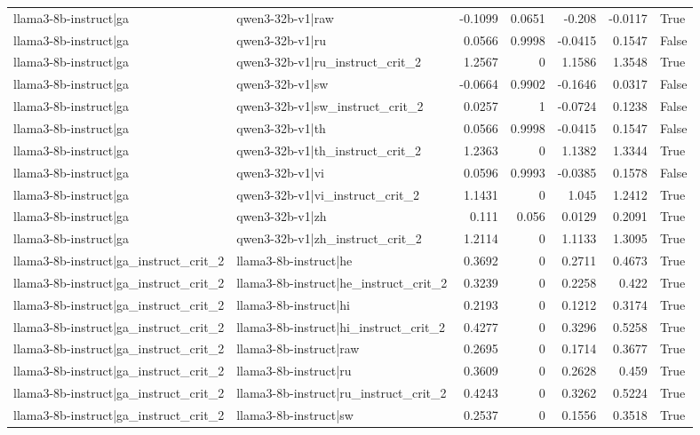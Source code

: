 \begin{table}
\begin{tabular}{l l r r r r l}
llama3-8b-instruct|ga & qwen3-32b-v1|raw & -0.1099 & 0.0651 & -0.208 & -0.0117 & True \\
llama3-8b-instruct|ga & qwen3-32b-v1|ru & 0.0566 & 0.9998 & -0.0415 & 0.1547 & False \\
llama3-8b-instruct|ga & qwen3-32b-v1|ru_instruct_crit_2 & 1.2567 & 0 & 1.1586 & 1.3548 & True \\
llama3-8b-instruct|ga & qwen3-32b-v1|sw & -0.0664 & 0.9902 & -0.1646 & 0.0317 & False \\
llama3-8b-instruct|ga & qwen3-32b-v1|sw_instruct_crit_2 & 0.0257 & 1 & -0.0724 & 0.1238 & False \\
llama3-8b-instruct|ga & qwen3-32b-v1|th & 0.0566 & 0.9998 & -0.0415 & 0.1547 & False \\
llama3-8b-instruct|ga & qwen3-32b-v1|th_instruct_crit_2 & 1.2363 & 0 & 1.1382 & 1.3344 & True \\
llama3-8b-instruct|ga & qwen3-32b-v1|vi & 0.0596 & 0.9993 & -0.0385 & 0.1578 & False \\
llama3-8b-instruct|ga & qwen3-32b-v1|vi_instruct_crit_2 & 1.1431 & 0 & 1.045 & 1.2412 & True \\
llama3-8b-instruct|ga & qwen3-32b-v1|zh & 0.111 & 0.056 & 0.0129 & 0.2091 & True \\
llama3-8b-instruct|ga & qwen3-32b-v1|zh_instruct_crit_2 & 1.2114 & 0 & 1.1133 & 1.3095 & True \\
llama3-8b-instruct|ga_instruct_crit_2 & llama3-8b-instruct|he & 0.3692 & 0 & 0.2711 & 0.4673 & True \\
llama3-8b-instruct|ga_instruct_crit_2 & llama3-8b-instruct|he_instruct_crit_2 & 0.3239 & 0 & 0.2258 & 0.422 & True \\
llama3-8b-instruct|ga_instruct_crit_2 & llama3-8b-instruct|hi & 0.2193 & 0 & 0.1212 & 0.3174 & True \\
llama3-8b-instruct|ga_instruct_crit_2 & llama3-8b-instruct|hi_instruct_crit_2 & 0.4277 & 0 & 0.3296 & 0.5258 & True \\
llama3-8b-instruct|ga_instruct_crit_2 & llama3-8b-instruct|raw & 0.2695 & 0 & 0.1714 & 0.3677 & True \\
llama3-8b-instruct|ga_instruct_crit_2 & llama3-8b-instruct|ru & 0.3609 & 0 & 0.2628 & 0.459 & True \\
llama3-8b-instruct|ga_instruct_crit_2 & llama3-8b-instruct|ru_instruct_crit_2 & 0.4243 & 0 & 0.3262 & 0.5224 & True \\
llama3-8b-instruct|ga_instruct_crit_2 & llama3-8b-instruct|sw & 0.2537 & 0 & 0.1556 & 0.3518 & True \\

\end{tabular}
\end{table}
